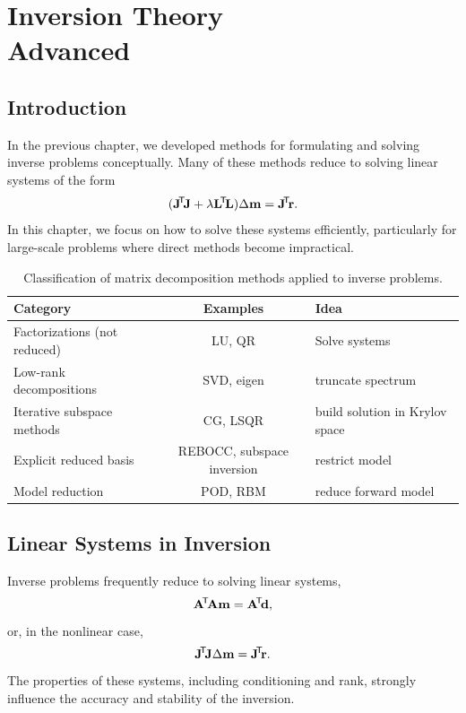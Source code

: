 \chapter[Inversion Theory: Advanced]{Inversion Theory\\ {\LARGE Advanced}}\label{ch:inversion2}

\section{Introduction}
In the previous chapter, we developed methods for formulating and solving inverse problems conceptually. Many of these methods reduce to solving linear systems of the form
\[
    (\vb{J}\!^\mathsf{T}\! \vb{J} + \lambda \vb{L}\!^\mathsf{T}\! \vb{L}) \Delta \vb{m}
    = \vb{J}\!^\mathsf{T}\! \vb{r}.
\]
In this chapter, we focus on how to solve these systems efficiently, particularly for large-scale problems where direct methods become impractical.

\begin{table}[htbp]
    \centering
    \caption{Classification of matrix decomposition methods applied to inverse problems.}
    \label{tab:decomp}
    \begin{tabular}{@{}lcl@{}}
        \toprule
        \textbf{Category} & \textbf{Examples} & \textbf{Idea} \\
        \midrule
        Factorizations (not reduced) & LU, QR & Solve systems \\
        Low-rank decompositions & SVD, eigen & truncate spectrum \\
        Iterative subspace methods & CG, LSQR & build solution in Krylov space \\
        Explicit reduced basis & REBOCC, subspace inversion & restrict model \\
        Model reduction & POD, RBM & reduce forward model \\
        \bottomrule
    \end{tabular}
\end{table}

\section{Linear Systems in Inversion}

Inverse problems frequently reduce to solving linear systems,
\[
    \vb{A}\!^\mathsf{T}\! \vb{A} \vb{m} = \vb{A}\!^\mathsf{T}\! \vb{d},
\]
or, in the nonlinear case,
\[
    \vb{J}\!^\mathsf{T}\! \vb{J} \Delta \vb{m} = \vb{J}\!^\mathsf{T}\! \vb{r}.
\]
The properties of these systems, including conditioning and rank, strongly influence the accuracy and stability of the inversion.

